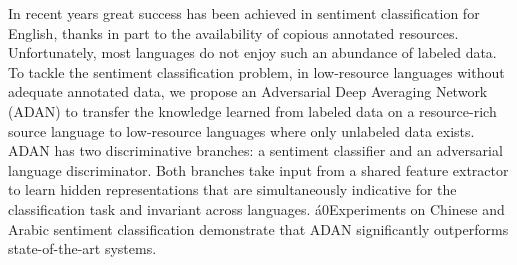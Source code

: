 In recent years great success has been achieved in sentiment classification for English, thanks in part to the availability of copious annotated resources. Unfortunately, most languages do not enjoy such an abundance of labeled data. To tackle the sentiment classification problem, in low-resource languages without adequate annotated data, we propose an Adversarial Deep Averaging Network (ADAN) to transfer the knowledge learned from labeled data on a resource-rich source language to low-resource languages where only unlabeled data exists. ADAN has two discriminative branches: a sentiment classifier and an adversarial language discriminator. Both branches take input from a shared feature extractor to learn hidden representations that are simultaneously indicative for the classification task and invariant across languages. \'a0Experiments on Chinese and Arabic sentiment classification demonstrate that ADAN significantly outperforms state-of-the-art systems.
